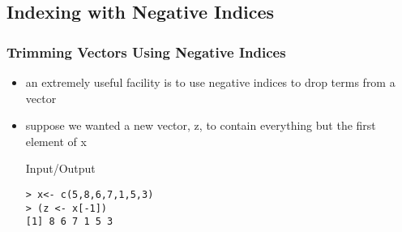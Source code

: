 \documentclass[xcolor={table},c]{beamer}
\begin{document}
\subsection{Indexing with Negative Indices}
\begin{frame}[fragile]\frametitle{Trimming Vectors Using Negative Indices} %
\begin{itemize}
\item an extremely useful facility is to use negative indices to drop terms from a vector
\item suppose we wanted a new vector, z, to contain everything but the first element of x
  \begin{exampleblock}{Input/Output}
\begin{verbatim} 
> x<- c(5,8,6,7,1,5,3)
> (z <- x[-1])
[1] 8 6 7 1 5 3
\end{verbatim}
  \end{exampleblock}
\end{itemize}
\end{frame}
\end{document}
